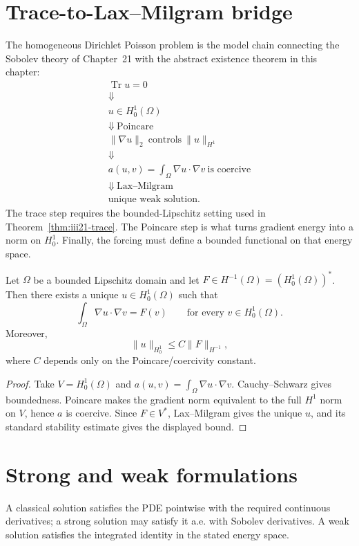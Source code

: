 \section{Trace-to-Lax--Milgram bridge}
The homogeneous Dirichlet Poisson problem is the model chain connecting the
Sobolev theory of Chapter~21 with the abstract existence theorem in this
chapter:
\[
\boxed{
\begin{array}{c}
\operatorname{Tr}u=0
\\[0.2em]\Downarrow\\[-0.1em]
u\in H_0^1(\Omega)
\\[0.2em]\Downarrow\ \text{Poincare}\\[-0.1em]
\|\nabla u\|_2\ \text{controls}\ \|u\|_{H^1}
\\[0.2em]\Downarrow\\[-0.1em]
a(u,v)=\int_\Omega \nabla u\cdot\nabla v
\ \text{is coercive}
\\[0.2em]\Downarrow\ \text{Lax--Milgram}\\[-0.1em]
\text{unique weak solution.}
\end{array}}
\]
The trace step requires the bounded-Lipschitz setting used in
Theorem~\ref{thm:iii21-trace}. The Poincare step is what turns gradient energy
into a norm on \(H_0^1\). Finally, the forcing must define a bounded functional
on that energy space.

\begin{theorem}\label{thm:iii23-poisson-lm}
Let \(\Omega\) be a bounded Lipschitz domain and let
\(F\in H^{-1}(\Omega)=(H_0^1(\Omega))^*\). Then there exists a unique
\(u\in H_0^1(\Omega)\) such that
\[
\int_\Omega \nabla u\cdot\nabla v=F(v)
\qquad\text{for every }v\in H_0^1(\Omega).
\]
Moreover,
\[
\|u\|_{H_0^1}\le C\|F\|_{H^{-1}},
\]
where \(C\) depends only on the Poincare/coercivity constant.
\begin{proof}
Take \(V=H_0^1(\Omega)\) and
\(a(u,v)=\int_\Omega\nabla u\cdot\nabla v\).
Cauchy--Schwarz gives boundedness. Poincare makes the gradient norm equivalent
to the full \(H^1\) norm on \(V\), hence \(a\) is coercive. Since
\(F\in V^*\), Lax--Milgram gives the unique \(u\), and its standard stability
estimate gives the displayed bound.
\end{proof}
\end{theorem}

\section{Strong and weak formulations}
A classical solution satisfies the PDE pointwise with the required continuous derivatives; a strong solution may satisfy it a.e. with Sobolev derivatives. A weak solution satisfies the integrated identity in the stated energy space.


